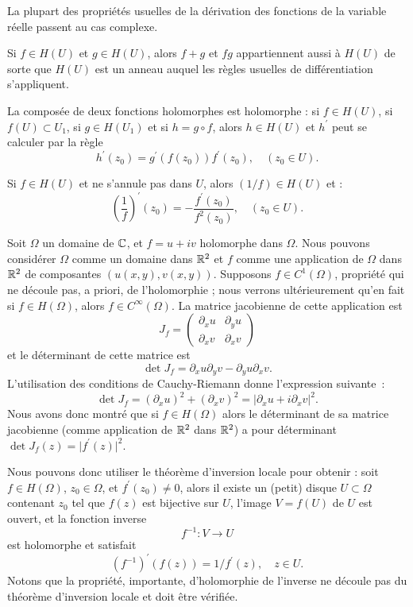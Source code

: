 La plupart des propriétés usuelles de la dérivation des fonctions de la variable réelle passent au cas complexe. 
\begin{fprop} 
Si $f \in H(U)$ et $g \in H(U)$, alors $f+g$ et $fg$ appartiennent aussi à $H(U)$ de sorte que $H(U)$ est un anneau auquel les règles usuelles de différentiation s'appliquent. 

La composée de deux fonctions holomorphes est holomorphe : si $f \in H(U)$, si $f(U) \subset U_1$, si $g \in H(U_1)$ et si $h=g \circ f$, alors $h \in H(U)$ et $h^\prime$ peut se calculer par la règle
\[h^\prime(z_0) =  g^\prime (f(z_0)) f^\prime (z_0), \quad (z_0 \in U).\]
  
Si $f \in H(U)$ et ne s'annule pas dans $U$, alors $(1/f) \in H(U)$ et : 
\[\left(\frac{1}{f}\right)^\prime (z_0)  = - \frac{f^\prime(z_0)}{f^2(z_0)}, \quad (z_0 \in U).\]
\end{fprop}

\begin{rem}
Soit $\Omega$ un domaine de $\mathbb{C}$, et $f =u +i v$ holomorphe dans $\Omega$. Nous pouvons considérer $\Omega$ comme un domaine dans $\mathbb R^2$ et $f$ comme une application de $\Omega$ dans $\mathbb R^2$ de composantes $(u(x,y), v(x,y))$. Supposons $f  \in C^1(\Omega)$,  propriété qui ne découle pas, a priori, de l'holomorphie ; nous verrons ultérieurement qu'en fait si $f \in H(\Omega)$, alors $f \in C^\infty(\Omega)$. La matrice jacobienne de cette application est 
\[J_f=\begin{pmatrix}
\partial_x u & \partial_y u\\
\partial_x v &\partial_x v 
\end{pmatrix}\]
et le déterminant de cette matrice est
\[\det J_f=\partial_x u \partial_y v - \partial_y u \partial_x v.\]
L'utilisation des conditions de Cauchy-Riemann donne l'expression suivante~:
  \[\det J_f=(\partial_x u)^2 + (\partial_x v)^2=\lvert \partial_x u + i \partial_x v \rvert ^2.\]
Nous avons donc montré que si $f \in H(\Omega)$ alors le déterminant de sa matrice jacobienne (comme application de $\mathbb R^2$ dans $\mathbb R^2$) a pour déterminant $\det J_f(z)=\lvert f^\prime(z)\rvert^2$.

Nous pouvons donc utiliser le théorème d'inversion locale  pour obtenir :  soit $f \in H(\Omega)$, $z_0 \in \Omega$, et $f^\prime(z_0) \neq 0$, alors il existe un (petit) disque $U \subset \Omega$ contenant $z_0$ tel que $f(z)$ est bijective sur $U$, l'image $V=f(U)$ de $U$ est ouvert, et la fonction inverse 
\[ f^{-1} \colon V \to U\]
est holomorphe et satisfait
\[(f^{-1})^\prime (f(z))=1/f^\prime(z), \quad z \in U.\]
Notons que la propriété, importante, d'holomorphie de l'inverse ne découle pas du théorème d'inversion locale et doit être vérifiée.  
\end{rem}


